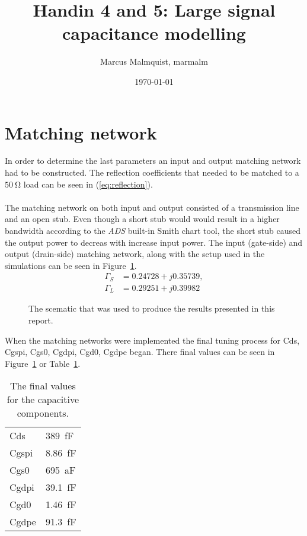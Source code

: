 \documentclass[12pt,a4paper]{article}
\title{Handin 4 and 5: Large signal capacitance modelling}
\author{Marcus Malmquist, marmalm}
\date{\today}
\begin{document}
\maketitle

\section{Matching network}\label{sec:1}
In order to determine the last parameters an input and output matching network had to be constructed. The reflection coefficients that needed to be matched to a $\SI{50}{\ohm}$ load can be seen in (\ref{eq:reflection}).
\\\\
The matching network on both input and output consisted of a transmission line and an open stub. Even though a short stub would would result in a higher bandwidth according to the \textit{ADS} built-in Smith chart tool, the short stub caused the output power to decreas with increase input power. The input (gate-side) and output (drain-side) matching network, along with the setup used in the simulations can be seen in Figure~\ref{fig:scematic}.
\begin{subequations}
  \label{eq:reflection}
  \begin{align}
    \Gamma_S&=0.24728+j0.35739, \label{eq:reflection_s}\\
    \Gamma_L&=0.29251+j0.39982 \label{eq:reflection_l}
  \end{align}
\end{subequations}
\begin{figure}[h]
  \centering
  \noindent{}
  \caption{The scematic that was used to produce the results presented in this report.}
  \label{fig:scematic}
\end{figure}
When the matching networks were implemented the final tuning process for Cds, Cgspi, Cgs0, Cgdpi, Cgd0, Cgdpe began. There final values can be seen in Figure~\ref{fig:scematic} or Table~\ref{tab:results}.
\begin{table}[h]
  \centering
  \begin{tabular}{|l|l|} \hline
    Cds & \SI{389}{\femto\farad} \\
    Cgspi & \SI{8.86}{\femto\farad} \\
    Cgs0 & \SI{695}{\atto\farad} \\
    Cgdpi & \SI{39.1}{\femto\farad} \\
    Cgd0 & \SI{1.46}{\femto\farad} \\
    Cgdpe & \SI{91.3}{\femto\farad} \\ \hline
  \end{tabular}
  \caption{The final values for the capacitive components.}
  \label{tab:results}
\end{table}
\end{document}
